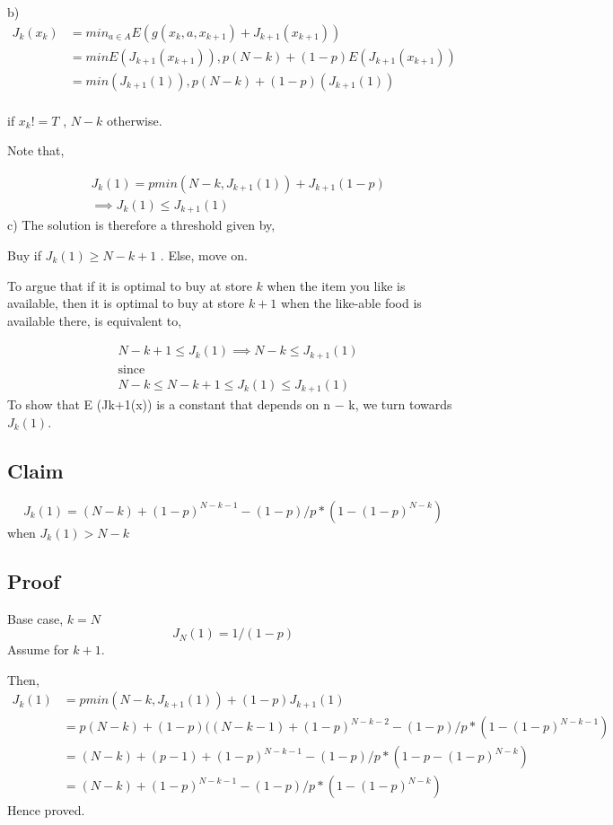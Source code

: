 \documentclass[12pt]{article}
\begin{document}
b) 
\begin{align*}
J_k(x_k)
& =min_{a \in A} E(g(x_k,a,x_{k+1})+J_{k+1}(x_{k+1})) \\
&=min E(J_{k+1}(x_{k+1})) , p(N-k)+(1-p) E(J_{k+1}(x_{k+1})) \\
&=min (J_{k+1}(1)) , p(N-k)+(1-p) (J_{k+1}(1)) \\
\end{align*}

if $x_k != T $ , $N-k$ otherwise.

Note that,

\begin{align}
&J_k(1)=pmin(N-k,J_{k+1}(1)) +J_{k+1}(1-p)  \\
& \implies J_k(1) \leqslant J_{k+1}(1) 
\end{align}
c) The solution is therefore a threshold given by,

Buy if $J_k(1) \geqslant N-k+1$ .
Else, move on.

To argue that if it is optimal to buy at store $k$ when the item you like is available, then it is optimal to buy at store $k + 1$ when the like-able food is available there, is equivalent to,

\begin{align*}
& N-k+1 \leqslant J_{k}(1) \implies N-k \leqslant J_{k+1}(1)\\
& \text{since}\\
& N-k  \leqslant N-k+1 \leqslant  J_{k}(1) \leqslant J_{k+1}(1)
\end{align*}
To show that E (Jk+1(x)) is a constant that depends on n − k, we turn towards $J_k(1)$. 

\subsection*{Claim}
$$ J_k(1)= (N-k) +(1-p)^{N-k-1} -(1-p)/p*(1-(1-p)^{N-k}) $$when $J_k(1)>N-k$
\subsection*{Proof}

Base case, $k=N$
$$ J_N(1) =1/(1-p) $$
Assume for $k+1$.

Then, 
\begin{align*}
J_k(1)
&=pmin(N-k,J_{k+1}(1))+(1-p)J_{k+1}(1) \\
& = p(N-k)+(1-p)((N-k-1) +(1-p)^{N-k-2} -(1-p)/p*(1-(1-p)^{N-k-1})\\
&=(N-k) +(p-1) +(1-p)^{N-k-1} -(1-p)/p*(1-p-(1-p)^{N-k})\\
&=  (N-k) +(1-p)^{N-k-1} -(1-p)/p*(1-(1-p)^{N-k})
\end{align*}
Hence proved.
\end{document}
